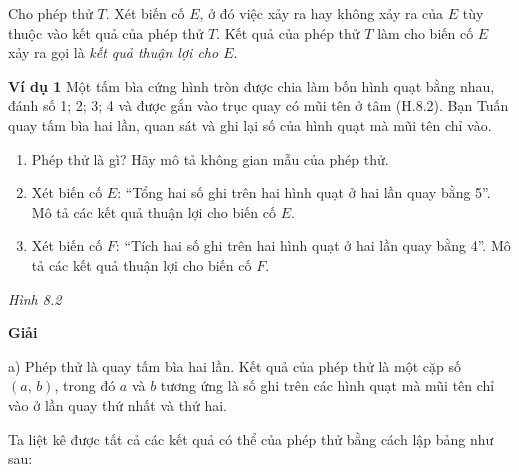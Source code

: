 \begin{lesson}
    \answerline
    \answerline

    \begin{keyconcept}
        Cho phép thử $T$. Xét biến cố $E$, ở đó việc xảy ra hay không xảy ra của $E$ tùy thuộc vào kết quả của phép thử $T$. Kết quả của phép thử $T$ làm cho biến cố $E$ xảy ra gọi là \textit{kết quả thuận lợi cho $E$}.
    \end{keyconcept}

    \textbf{Ví dụ 1} Một tấm bìa cứng hình tròn được chia làm bốn hình quạt bằng nhau, đánh số 1; 2; 3; 4 và được gắn vào trục quay có mũi tên ở tâm (H.8.2). Bạn Tuấn quay tấm bìa hai lần, quan sát và ghi lại số của hình quạt mà mũi tên chỉ vào.
    \begin{enumerate}[label=\alph*)]
        \item Phép thử là gì? Hãy mô tả không gian mẫu của phép thử.
        \item Xét biến cố $E$: “Tổng hai số ghi trên hai hình quạt ở hai lần quay bằng 5”. Mô tả các kết quả thuận lợi cho biến cố $E$.
        \item Xét biến cố $F$: “Tích hai số ghi trên hai hình quạt ở hai lần quay bằng 4”. Mô tả các kết quả thuận lợi cho biến cố $F$.
    \end{enumerate}

    \begin{center}

        \textit{Hình 8.2}
    \end{center}

    \textbf{Giải}

    a) Phép thử là quay tấm bìa hai lần. Kết quả của phép thử là một cặp số $(a,\,b)$, trong đó $a$ và $b$ tương ứng là số ghi trên các hình quạt mà mũi tên chỉ vào ở lần quay thứ nhất và thứ hai.

    Ta liệt kê được tất cả các kết quả có thể của phép thử bằng cách lập bảng như sau:


\end{lesson}
